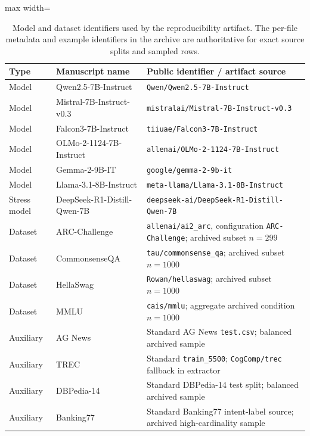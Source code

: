 \begin{table}[H]
\centering
\small
\caption{Model and dataset identifiers used by the reproducibility artifact. The per-file metadata and example identifiers in the archive are authoritative for exact source splits and sampled rows.}
\label{tab:artifact-identifiers}
\begin{adjustbox}{max width=\textwidth}
\begin{tabular}{lll}
\toprule
Type & Manuscript name & Public identifier / artifact source \\
\midrule
Model & Qwen2.5-7B-Instruct & \texttt{Qwen/Qwen2.5-7B-Instruct} \\
Model & Mistral-7B-Instruct-v0.3 & \texttt{mistralai/Mistral-7B-Instruct-v0.3} \\
Model & Falcon3-7B-Instruct & \texttt{tiiuae/Falcon3-7B-Instruct} \\
Model & OLMo-2-1124-7B-Instruct & \texttt{allenai/OLMo-2-1124-7B-Instruct} \\
Model & Gemma-2-9B-IT & \texttt{google/gemma-2-9b-it} \\
Model & Llama-3.1-8B-Instruct & \texttt{meta-llama/Llama-3.1-8B-Instruct} \\
Stress model & DeepSeek-R1-Distill-Qwen-7B & \texttt{deepseek-ai/DeepSeek-R1-Distill-Qwen-7B} \\
Dataset & ARC-Challenge & \texttt{allenai/ai2\_arc}, configuration \texttt{ARC-Challenge}; archived subset $n=299$ \\
Dataset & CommonsenseQA & \texttt{tau/commonsense\_qa}; archived subset $n=1000$ \\
Dataset & HellaSwag & \texttt{Rowan/hellaswag}; archived subset $n=1000$ \\
Dataset & MMLU & \texttt{cais/mmlu}; aggregate archived condition $n=1000$ \\
Auxiliary & AG News & Standard AG News \texttt{test.csv}; balanced archived sample \\
Auxiliary & TREC & Standard \texttt{train\_5500}; \texttt{CogComp/trec} fallback in extractor \\
Auxiliary & DBPedia-14 & Standard DBPedia-14 test split; balanced archived sample \\
Auxiliary & Banking77 & Standard Banking77 intent-label source; archived high-cardinality sample \\
\bottomrule
\end{tabular}
\end{adjustbox}
\end{table}
